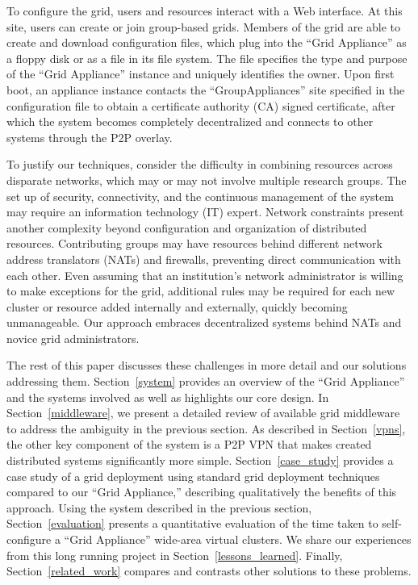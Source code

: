 \documentclass[conference]{IEEEtran}
\begin{document}
To configure the grid, users and resources interact with a Web interface.  At
this site, users can create or join group-based grids.  Members of the grid are
able to create and download configuration files, which plug into the ``Grid
Appliance'' as a floppy disk or as a file in its file system.  The file
specifies the type and purpose of the ``Grid Appliance'' instance and uniquely
identifies the owner.  Upon first boot, an appliance instance contacts the
``GroupAppliances'' site specified in the configuration file to obtain a
certificate authority (CA) signed certificate, after which the system becomes
completely decentralized and connects to other systems through the P2P overlay.  

To justify our techniques, consider the difficulty in combining resources
across disparate networks, which may or may not involve multiple research
groups.  The set up of security, connectivity, and the continuous management of the system may require
an information technology (IT) expert.  Network constraints present another
complexity beyond configuration and organization of distributed resources.
Contributing groups may have resources behind different network address
translators (NATs) and firewalls, preventing direct communication with each
other.  Even assuming that an institution's network administrator is willing to
make exceptions for the grid, additional rules may be required for each new
cluster or resource added internally and externally, quickly becoming
unmanageable.  Our approach embraces decentralized systems behind NATs and
novice grid administrators.

The rest of this paper discusses these challenges in more detail and our
solutions addressing them.  Section~\ref{system} provides an overview of the
``Grid Appliance'' and the systems involved as well as highlights our core
design.  In Section~\ref{middleware}, we present a detailed review of available
grid middleware to address the ambiguity in the previous section.  As described
in Section~\ref{vpns}, the other key component of the system is a P2P VPN that
makes created distributed systems significantly more simple.
Section~\ref{case_study} provides a case study of a grid deployment using
standard grid deployment techniques compared to our ``Grid Appliance,''
describing qualitatively  the benefits of this approach.  Using the system
described in the previous section, Section~\ref{evaluation} presents a
quantitative evaluation of the time taken to self-configure a ``Grid
Appliance'' wide-area virtual clusters.  We share our experiences from this
long running project in Section~\ref{lessons_learned}.  Finally,
Section~\ref{related_work} compares and contrasts other solutions to these
problems.
\end{document}
